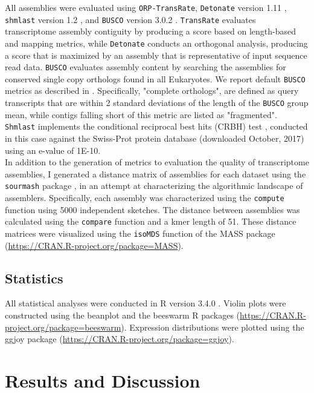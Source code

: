 \documentclass[10pt,letterpaper]{article}
\begin{document}
All assemblies were evaluated using \texttt{ORP-TransRate}, \texttt{Detonate} version 1.11 \cite{Li:2014cma}, \texttt{shmlast} version 1.2 \citep{Scott:2017eg}, and \texttt{BUSCO} version 3.0.2 \citep{Simao:2015kk}. \texttt{TransRate} evaluates transcriptome assembly contiguity by producing a score based on length-based and mapping metrics, while \texttt{Detonate} conducts an orthogonal analysis, producing a score that is maximized by an assembly that is representative of input sequence read data. \texttt{BUSCO} evaluates assembly content by searching the assemblies for conserved single copy orthologs found in all Eukaryotes. We report default \texttt{BUSCO} metrics as described in \cite{Simao:2015kk}. Specifically, "complete orthologs", are defined as query transcripts that are within 2 standard deviations of the length of the \texttt{BUSCO} group mean, while contigs falling short of this metric are listed as "fragmented". \texttt{Shmlast} implements the conditional reciprocal best hits (CRBH) test \citep{Aubry:2014en}, conducted in this case against the Swiss-Prot protein database (downloaded October, 2017) using an e-value of 1E-10.   \\

In addition to the generation of metrics to evaluation the quality of transcriptome assemblies, I generated a distance matrix of assemblies for each dataset using the \texttt{sourmash} package \citep{TitusBrown:2016jg}, in an attempt at characterizing the algorithmic landscape of assemblers. Specifically, each assembly was characterized using the \texttt{compute} function using 5000 independent sketches. The distance between assemblies was calculated using the \texttt{compare} function and a kmer length of 51. These distance matrices were visualized using the \texttt{isoMDS} function of the MASS package (\url{https://CRAN.R-project.org/package=MASS}). 

\subsection{Statistics}

All statistical analyses were conducted in R version 3.4.0 \citep{RALanguageandEn:wf}. Violin plots were constructed using the beanplot \citep{Kampstra:2008vc} and the beeswarm R packages (\url{https://CRAN.R-project.org/package=beeswarm}). Expression distributions were plotted using the ggjoy package (\url{https://CRAN.R-project.org/package=ggjoy}).   

\section{Results and Discussion}
\end{document}
